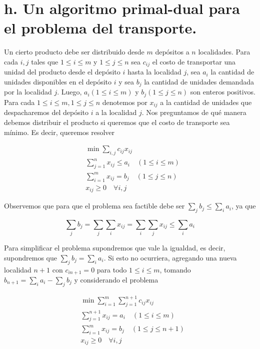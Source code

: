 \documentclass[10pt]{article}
\begin{document}
\section*{h. Un algoritmo primal-dual para el problema del transporte.}
Un cierto producto debe ser distribuido desde $m$ depósitos a $n$ localidades. Para cada $i, j$ tales que $1 \leq i \leq m$ y $1 \leq j \leq n$ sea $c_{i j}$ el costo de transportar una unidad del producto desde el depósito $i$ hasta la localidad $j$, sea $a_{i}$ la cantidad de unidades disponibles en el depósito $i$ y sea $b_{j}$ la cantidad de unidades demandada por la localidad $j$. Luego, $a_{i}(1 \leq i \leq m)$ y $b_{j}(1 \leq j \leq n)$ son enteros positivos.\\
Para cada $1 \leq i \leq m, 1 \leq j \leq n$ denotemos por $x_{i j}$ a la cantidad de unidades que despacharemos del depósito $i$ a la localidad $j$. Nos preguntamos de qué manera debemos distribuir el producto si queremos que el costo de transporte sea mínimo. Es decir, queremos resolver


\begin{align*}
& \min \sum_{i, j} c_{i j} x_{i j} \\
& \sum_{j=1}^{n} x_{i j} \leq a_{i} \quad(1 \leq i \leq m)  \tag{4}\\
& \sum_{i=1}^{m} x_{i j}=b_{j} \quad(1 \leq j \leq n) \\
& x_{i j} \geq 0 \quad \forall i, j
\end{align*}


Observemos que para que el problema sea factible debe ser $\sum_{j} b_{j} \leq \sum_{i} a_{i}$, ya que

$$
\sum_{j} b_{j}=\sum_{j} \sum_{i} x_{i j}=\sum_{i} \sum_{j} x_{i j} \leq \sum_{i} a_{i}
$$

Para simplificar el problema supondremos que vale la igualdad, es decir, supondremos que $\sum_{j} b_{j}=\sum_{i} a_{i}$. Si esto no ocurriera, agregando una nueva localidad $n+1$ con $c_{i n+1}=0$ para todo $1 \leq i \leq m$, tomando $b_{n+1}=\sum_{i} a_{i}-\sum_{j} b_{j}$ y considerando el problema


\begin{align*}
& \min \sum_{i=1}^{m} \sum_{j=1}^{n+1} c_{i j} x_{i j} \\
& \sum_{j=1}^{n+1} x_{i j}=a_{i} \quad(1 \leq i \leq m)  \tag{5}\\
& \sum_{i=1}^{m} x_{i j}=b_{j} \quad(1 \leq j \leq n+1) \\
& x_{i j} \geq 0 \quad \forall i, j
\end{align*}
\end{document}
